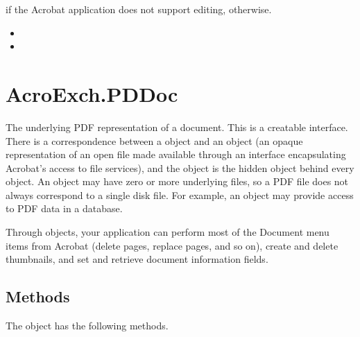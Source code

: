\documentclass[letterpaper,12pt,english,openany,oneside]{sphinxmanual}
\begin{document}

 if the Acrobat application does not support editing,  otherwise.

\label{\detokenize{IAC_API_OLE_Objects:related-methods-87}}
\begin{itemize}
\item {} 
 

\item {} 
 

\end{itemize}




\section{AcroExch.PDDoc}
\label{\detokenize{IAC_API_OLE_Objects:acroexch-pddoc}}
The underlying PDF representation of a document. This is a creatable interface. There is a correspondence between a  object and an  object (an opaque representation of an open file made available through an interface encapsulating Acrobat’s access to file services), and the  object is the hidden object behind every  object. An  object may have zero or more underlying files, so a PDF file does not always correspond to a single disk file. For example, an  object may provide access to PDF data in a database.

Through  objects, your application can perform most of the Document menu items from Acrobat (delete pages, replace pages, and so on), create and delete thumbnails, and set and retrieve document information fields.


\subsection{Methods}
\label{\detokenize{IAC_API_OLE_Objects:methods-5}}\label{\detokenize{IAC_API_OLE_Objects:id16}}
The  object has the following methods.
\end{document}
